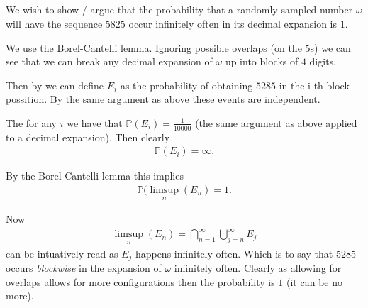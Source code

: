 \documentclass{unswmaths}
\begin{document}
\subsection{}

We wish to show / argue that the probability that a randomly sampled number $ \omega $ will have the sequence $ 5825 $ occur infinitely often in its decimal expansion is 1.

We use the Borel-Cantelli lemma. Ignoring possible overlaps (on the $5$s) we can see that we can break any decimal expansion of $ \omega $ up into blocks of $ 4 $ digits. 

Then by we can define $ E_i $ as the probability of obtaining $ 5285 $ in the i-th block possition. By the same argument as above these events are independent.

The for any $ i $ we have that $ \mathbb{P}(E_i) = \frac{1}{10000} $ (the same argument as above applied to a decimal expansion). Then clearly
\begin{align}
  \mathbb{P}( E_i ) = \infty.
\end{align}

By the Borel-Cantelli lemma this implies
\begin{align}
  \mathbb{P}( \limsup_n( E_n ) = 1.
\end{align}

Now 
\begin{align}
  \limsup_n( E_n ) = \bigcap_{n=1}^\infty \bigcup_{j=n}^\infty E_j 
\end{align}
can be intuatively read as $ E_j $ happens infinitely often. Which is to say that $ 5285 $ occurs \emph{blockwise} in the expansion of $ \omega $ infinitely often. Clearly as allowing for overlaps allows for more configurations then the probability is $ 1 $ (it can be no more). 
\end{document}
